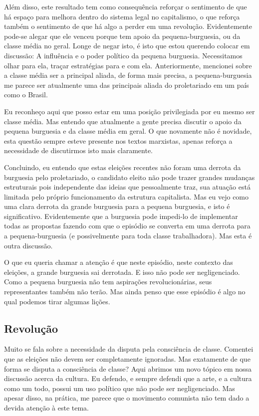Além disso, este resultado tem como consequência reforçar o sentimento de que há espaço para melhora dentro do sistema legal no capitalismo, o que reforça também o sentimento de que há algo a perder em uma revolução. Evidentemente pode-se alegar que ele venceu porque tem apoio da pequena-burguesia, ou da classe média no geral. Longe de negar isto, é isto que estou querendo colocar em discussão: A influência e o poder político da pequena burguesia. Necessitamos olhar para ela, traçar estratégias para e com ela. Anteriormente, mencionei sobre a classe média ser a principal aliada, de forma mais precisa, a pequena-burguesia me parece ser atualmente uma das principais aliada do proletariado em um país como o Brasil.

Eu reconheço aqui que posso estar em uma posição privilegiada por eu mesmo ser classe média. Mas entendo que atualmente a gente precisa discutir o apoio da pequena burguesia e da classe média em geral. O que novamente não é novidade, esta questão sempre esteve presente nos textos marxistas, apenas reforça a necessidade de discutirmos isto mais claramente.

Concluindo, eu entendo que estas eleições recentes não foram uma derrota da burguesia pelo proletariado, o candidato eleito não pode trazer grandes mudanças estruturais pois independente das ideias que pessoalmente traz, sua atuação está limitada pelo próprio funcionamento da estrutura capitalista. Mas eu vejo como uma clara derrota da grande burguesia para a pequena burguesia, e isto é significativo. Evidentemente que a burguesia pode impedi-lo de implementar todas as propostas fazendo com que o episódio se converta em uma derrota para a pequena-burguesia (e possivelmente para toda classe trabalhadora). Mas esta é outra discussão.

O que eu queria chamar a atenção é que neste episódio, neste contexto das eleições, a grande burguesia sai derrotada. E isso não pode ser negligenciado. Como a pequena burguesia não tem aspirações revolucionárias, seus representantes também não terão. Mas ainda penso que esse episódio é algo no qual podemos tirar algumas lições.

\subsection{Revolução}

Muito se fala sobre a necessidade da disputa pela consciência de classe. Comentei que as eleições não devem ser completamente ignoradas. Mas exatamente de que forma se disputa a consciência de classe? Aqui abrimos um novo tópico em nossa discussão acerca da cultura. Eu defendo, e sempre defendi que a arte, e a cultura como um todo, possui um uso político que não pode ser negligenciado. Mas apesar disso, na prática, me parece que o movimento comunista não tem dado a devida atenção à este tema.

